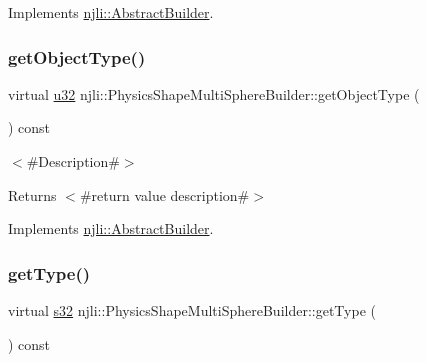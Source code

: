 Implements \mbox{\hyperlink{classnjli_1_1_abstract_builder_a902f73ea78031b06aca183a417f3413b}{njli\+::\+Abstract\+Builder}}.

\mbox{\label{classnjli_1_1_physics_shape_multi_sphere_builder_a44c971909b48ec8c5e5cbf7a147df377}} 
\subsubsection{\texorpdfstring{get\+Object\+Type()}{getObjectType()}}
{\footnotesize\ttfamily virtual \mbox{\hyperlink{_util_8h_a10e94b422ef0c20dcdec20d31a1f5049}{u32}} njli\+::\+Physics\+Shape\+Multi\+Sphere\+Builder\+::get\+Object\+Type (\begin{DoxyParamCaption}{ }\end{DoxyParamCaption}) const\hspace{0.3cm}{\ttfamily [virtual]}}

$<$\#\+Description\#$>$

\begin{DoxyReturn}{Returns}
$<$\#return value description\#$>$ 
\end{DoxyReturn}


Implements \mbox{\hyperlink{classnjli_1_1_abstract_builder_a0f2d344fcf697b167f4f2b1122b5fb33}{njli\+::\+Abstract\+Builder}}.

\mbox{\label{classnjli_1_1_physics_shape_multi_sphere_builder_a12ce7d034b9952a770362acb3b4ab0f3}} 
\subsubsection{\texorpdfstring{get\+Type()}{getType()}}
{\footnotesize\ttfamily virtual \mbox{\hyperlink{_util_8h_aa62c75d314a0d1f37f79c4b73b2292e2}{s32}} njli\+::\+Physics\+Shape\+Multi\+Sphere\+Builder\+::get\+Type (\begin{DoxyParamCaption}{ }\end{DoxyParamCaption}) const\hspace{0.3cm}{\ttfamily [virtual]}}


